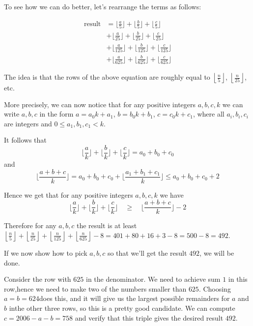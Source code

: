 \begin{enumerate}
 To see how we can do better, let's rearrange the terms as follows:

 
 \begin{align*} \text{result} & = \Big\lfloor \frac a{5}\Big\rfloor + \Big\lfloor \frac b{5}\Big\rfloor + \Big\lfloor \frac c{5}\Big\rfloor \\ & + \Big\lfloor \frac a{25}\Big\rfloor + \Big\lfloor \frac b{25}\Big\rfloor + \Big\lfloor \frac c{25}\Big\rfloor \\ & + \Big\lfloor \frac a{125}\Big\rfloor + \Big\lfloor \frac b{125}\Big\rfloor + \Big\lfloor \frac c{125}\Big\rfloor \\ & + \Big\lfloor \frac a{625}\Big\rfloor + \Big\lfloor \frac b{625}\Big\rfloor + \Big\lfloor \frac c{625}\Big\rfloor \end{align*}


 The idea is that the rows of the above equation are roughly equal to $\left\lfloor \frac n{5}\right\rfloor$, $\left\lfloor \frac n{25}\right\rfloor$, etc.

 More precisely, we can now notice that for any positive integers $a,b,c,k$ we can write $a,b,c$ in the form $a=a_0k + a_1$, $b=b_0k+b_1$, $c=c_0k + c_1$, where all $a_i,b_i,c_i$ are integers and $0\leq a_1,b_1,c_1<k$.

 It follows that
 \[\Big\lfloor \frac a{k}\Big\rfloor + \Big\lfloor \frac b{k}\Big\rfloor + \Big\lfloor \frac c{k}\Big\rfloor = a_0+b_0+c_0\]and
 \[\Big\lfloor \frac {a+b+c}k\Big\rfloor = a_0 + b_0 + c_0 + \Big\lfloor \frac {a_1+b_1+c_1}k\Big\rfloor \leq a_0 + b_0 + c_0 + 2\]

 Hence we get that for any positive integers $a,b,c,k$ we have
 \[\Big\lfloor \frac a{k}\Big\rfloor + \Big\lfloor \frac b{k}\Big\rfloor + \Big\lfloor \frac c{k}\Big\rfloor \quad \geq \quad \Big\lfloor \frac {a+b+c}k\Big\rfloor - 2\]

 Therefore for any $a,b,c$ the result is at least $\left\lfloor \frac n{5}\right\rfloor + \left\lfloor \frac n{25}\right\rfloor + \left\lfloor \frac n{125}\right\rfloor + \left\lfloor \frac n{625}\right\rfloor - 8 = 401 + 80 + 16 + 3 - 8 = 500 - 8 = 492$.

 If we now show how to pick $a,b,c$ so that we'll get the result $492$, we will be done.

 Consider the row with $625$ in the denominator. We need to achieve sum $1$ in this row,hence we need to make two of the numbers smaller than $625$. Choosing $a=b=624$does this, and it will give us the largest possible remainders for $a$ and $b$ inthe other three rows, so this is a pretty good candidate. We can compute$c=2006-a-b=758$ and verify that this triple gives the desired result $\boxed{492}$.


\end{enumerate}
